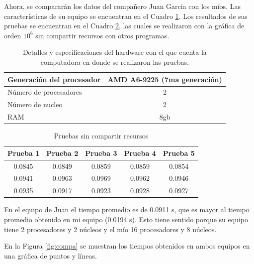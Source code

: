 \documentclass{article}
\begin{document}
Ahora, se compararán los datos del compañero Juan Garcia con los míos. Las características de su equipo se encuentran en el Cuadro \ref{table:juanpc}. Los resultados de sus pruebas se encuentran en el Cuadro \ref{table:juanres}, las cuales se realizaron con la gráfica de orden $10^6$ sin compartir recursos con otros programas.

\begin{table}[htbp]
\centering
\begin{tabular}{|l|c|}
\hline
Generación del procesador & AMD A6-9225 (7ma generación) \\ \hline
Número de procesadores & 2 \\ \hline
Número de nucleo & 2 \\ \hline
RAM & 8gb \\ \hline
\end{tabular} \quad
\caption{Detalles y especificaciones del hardware con el que cuenta la computadora en donde se realizaron las pruebas.} \label{table:juanpc}
\end{table}

\begin{table}[htbp]
\begin{tabular}{|c|c|c|c|c|}
\hline
\textbf{Prueba 1} & \textbf{Prueba 2} & \textbf{Prueba 3} & \textbf{Prueba 4} & \textbf{Prueba 5} \\ \hline
0.0845 & 0.0849 & 0.0859 & 0.0859 & 0.0854 \\ \hline
0.0941 & 0.0963 & 0.0969 & 0.0962 & 0.0946 \\ \hline
0.0935 & 0.0917 & 0.0923 & 0.0928 & 0.0927 \\ \hline
\end{tabular}
\caption{Pruebas sin compartir recursos} \label{table:juanres}
\end{table}

En el equipo de Juan el tiempo promedio es de 0.0911 s, que es mayor al tiempo promedio obtenido en mi equipo (0.0194 s). Esto tiene sentido porque su equipo tiene 2 procesadores y 2 núcleos y el mío 16 procesadores y 8 núcleos.

En la Figura \ref{fig:compa} se muestran los tiempos obtenidos en ambos equipos en una gráfica de puntos y líneas.
\end{document}
